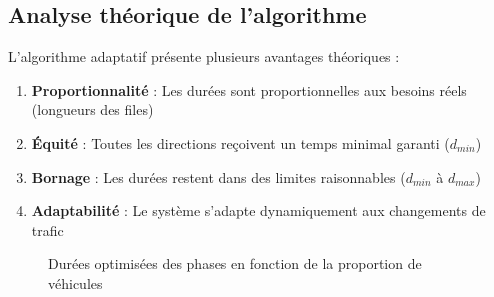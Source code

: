 \subsection{Analyse théorique de l'algorithme}
\label{subsec:analyse}

L'algorithme adaptatif présente plusieurs avantages théoriques :

\begin{enumerate}
    \item \textbf{Proportionnalité} : Les durées sont proportionnelles aux besoins réels (longueurs des files)
    \item \textbf{Équité} : Toutes les directions reçoivent un temps minimal garanti ($d_{min}$)
    \item \textbf{Bornage} : Les durées restent dans des limites raisonnables ($d_{min}$ à $d_{max}$)
    \item \textbf{Adaptabilité} : Le système s'adapte dynamiquement aux changements de trafic
\end{enumerate}

\begin{figure}[h]
\centering
{}
\caption{Durées optimisées des phases en fonction de la proportion de véhicules}
\label{fig:optimisation}
\end{figure}

